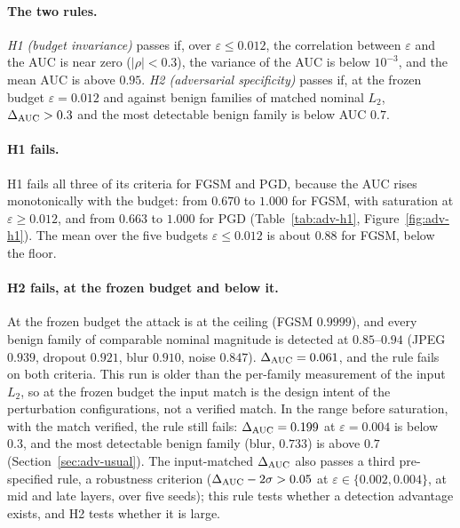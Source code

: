 \documentclass[../ppgc-tese.tex]{subfiles}
\begin{document}
\paragraph*{The two rules.}
\emph{H1 (budget invariance)} passes if, over $\varepsilon\leq0.012$, the
correlation between $\varepsilon$ and the AUC is near zero ($|\rho|<0.3$), the
variance of the AUC is below $10^{-3}$, and the mean AUC is above $0.95$.
\emph{H2 (adversarial specificity)} passes if, at the frozen budget
$\varepsilon{=}0.012$ and against benign families of matched nominal $L_2$,
$\Delta_{\mathrm{AUC}}>0.3$ and the most detectable benign family is below AUC $0.7$.

\paragraph*{H1 fails.}
H1 fails all three of its criteria for FGSM and PGD, because the AUC rises
monotonically with the budget: from $0.670$ to $1.000$ for FGSM, with
saturation at $\varepsilon\geq0.012$, and from $0.663$ to $1.000$ for PGD
(Table~\ref{tab:adv-h1}, Figure~\ref{fig:adv-h1}). The mean over the five
budgets $\varepsilon\leq0.012$ is about $0.88$ for FGSM, below the floor.

\paragraph*{H2 fails, at the frozen budget and below it.}
At the frozen budget the attack is at the ceiling (FGSM $0.9999$), and every
benign family of comparable nominal magnitude is detected at $0.85$--$0.94$
(JPEG $0.939$, dropout $0.921$, blur $0.910$, noise $0.847$). $\Delta_{\mathrm{AUC}} = 0.061$,
and the rule fails on both criteria.
This run is older than the per-family measurement of the input $L_2$, so at
the frozen budget the input match is the design intent of the perturbation
configurations, not a verified match. In the range before saturation, with the
match verified, the rule still fails: $\Delta_{\mathrm{AUC}} = 0.199$ at $\varepsilon{=}0.004$
is below $0.3$, and the most detectable benign family (blur, $0.733$) is above
$0.7$ (Section~\ref{sec:adv-usual}). The input-matched $\Delta_{\mathrm{AUC}}$ also passes a third pre-specified rule, a robustness criterion
($\Delta_{\mathrm{AUC}}-2\sigma > 0.05$ at $\varepsilon\in\{0.002,0.004\}$, at mid and late
layers, over five seeds); this rule tests whether a detection advantage
exists, and H2 tests whether it is large.
\end{document}
